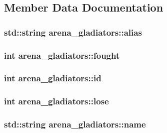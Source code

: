 \subsection{Member Data Documentation}
\hypertarget{classarena__gladiators_a123efad23d061b043c9d09f083b18c2f}{
\subsubsection[{alias}]{\setlength{\rightskip}{0pt plus 5cm}std\-::string arena\-\_\-gladiators\-::alias}}\label{classarena__gladiators_a123efad23d061b043c9d09f083b18c2f}
\hypertarget{classarena__gladiators_a2d3441bfc9a46e7ccf83d2328edd1981}{
\subsubsection[{fought}]{\setlength{\rightskip}{0pt plus 5cm}int arena\-\_\-gladiators\-::fought}}\label{classarena__gladiators_a2d3441bfc9a46e7ccf83d2328edd1981}
\hypertarget{classarena__gladiators_a8ca809345e524c1e1c6aec14f8e22a44}{
\subsubsection[{id}]{\setlength{\rightskip}{0pt plus 5cm}int arena\-\_\-gladiators\-::id}}\label{classarena__gladiators_a8ca809345e524c1e1c6aec14f8e22a44}
\hypertarget{classarena__gladiators_a43b6183e03a4552bbf147bc7825868b5}{
\subsubsection[{lose}]{\setlength{\rightskip}{0pt plus 5cm}int arena\-\_\-gladiators\-::lose}}\label{classarena__gladiators_a43b6183e03a4552bbf147bc7825868b5}
\hypertarget{classarena__gladiators_abbfb775525439f543d6a604347418340}{
\subsubsection[{name}]{\setlength{\rightskip}{0pt plus 5cm}std\-::string arena\-\_\-gladiators\-::name}}\label{classarena__gladiators_abbfb775525439f543d6a604347418340}
